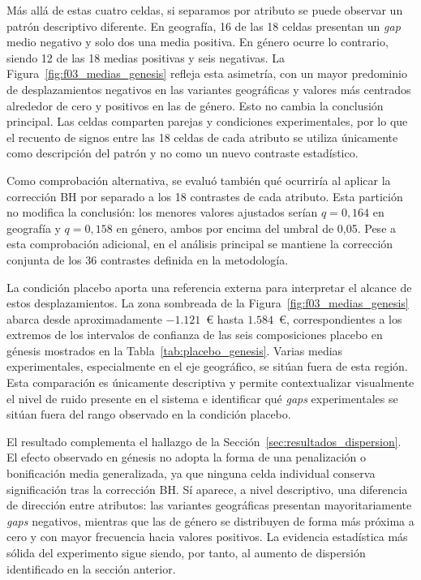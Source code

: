 Más allá de estas cuatro celdas, si separamos por atributo se puede observar un patrón descriptivo diferente. En geografía, 16 de las 18 celdas presentan un \textit{gap} medio negativo y solo dos una media positiva. En género ocurre lo contrario, siendo 12 de las 18 medias positivas y seis negativas. La Figura~\ref{fig:f03_medias_genesis} refleja esta asimetría, con un mayor predominio de desplazamientos negativos en las variantes geográficas y valores más centrados alrededor de cero y positivos en las de género. Esto no cambia la conclusión principal. Las celdas comparten parejas y condiciones experimentales, por lo que el recuento de signos entre las 18 celdas de cada atributo se utiliza únicamente como descripción del patrón y no como un nuevo contraste estadístico.

Como comprobación alternativa, se evaluó también qué ocurriría al aplicar la corrección BH por separado a los 18 contrastes de cada atributo. Esta partición no modifica la conclusión: los menores valores ajustados serían $q=0{,}164$ en geografía y $q=0{,}158$ en género, ambos por encima del umbral de 0,05. Pese a esta comprobación adicional, en el análisis principal se mantiene la corrección conjunta de los 36 contrastes definida en la metodología.

La condición placebo aporta una referencia externa para interpretar el alcance de estos desplazamientos. La zona sombreada de la Figura~\ref{fig:f03_medias_genesis} abarca desde aproximadamente $-1.121$~€ hasta $1.584$~€, correspondientes a los extremos de los intervalos de
confianza de las seis composiciones placebo en génesis mostrados en la Tabla~\ref{tab:placebo_genesis}. Varias medias experimentales, especialmente en el eje geográfico, se sitúan fuera de esta región. Esta comparación es únicamente descriptiva y permite contextualizar visualmente el nivel de ruido presente en el sistema e identificar qué \textit{gaps} experimentales se sitúan fuera del rango observado en la condición placebo.

El resultado complementa el hallazgo de la Sección~\ref{sec:resultados_dispersion}. El efecto observado en génesis no adopta la forma de una penalización o bonificación media generalizada, ya que
ninguna celda individual conserva significación tras la corrección BH. Sí aparece, a nivel descriptivo, una diferencia de dirección entre atributos: las variantes geográficas presentan mayoritariamente \textit{gaps} negativos, mientras que las de género se distribuyen de forma más próxima a cero y con mayor frecuencia hacia valores positivos. La evidencia estadística más sólida del experimento sigue siendo, por tanto, al aumento de dispersión identificado en la sección anterior.

